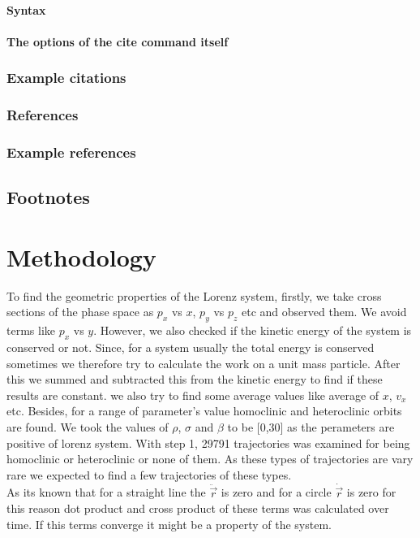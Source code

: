 \documentclass[%
reprint,
amsmath,amssymb,
aps,
floatfix,
]{revtex4-2}
\begin{document}
	
	\paragraph{Syntax}
	
	
	\paragraph{The options of the cite command itself}
	
	
	\subsubsection{Example citations}
	
	
	\subsubsection{References}
	
	
	\subsubsection{Example references}
	
	
	
	
	\subsection{Footnotes}%
	
	\section{Methodology}
	To find the geometric properties of the Lorenz system, firstly, we take cross sections of the phase space as $p_x$ vs $x$, $p_y$ vs $p_z$ etc and observed them. We avoid terms like $p_x$ vs $y$. However, we also checked if the kinetic energy of the system is conserved or not. Since, for a system usually the total energy is conserved sometimes we therefore try to calculate the work on a unit mass particle. After this we summed and subtracted this from the kinetic energy to find if these results are constant. 
	we also try to find some average values like average of $x$, $v_x$ etc. Besides, for a range of parameter's value homoclinic and heteroclinic orbits are found. We took the values of $\rho$, $\sigma$ and $\beta$ to be [0,30] as the perameters are positive of lorenz system. With step 1, 29791 trajectories was examined for being homoclinic or heteroclinic or none of them. As these types of trajectories are vary rare we expected to find a few trajectories of these types.    \\
	As its known that for a straight line the $\ddot{\vec{r}}$ is zero and for a circle $\dot{\vec{r}}$ is zero for this reason dot product and cross product of these terms was calculated over time. If this terms converge it might be a property of the system.
	
\end{document}
